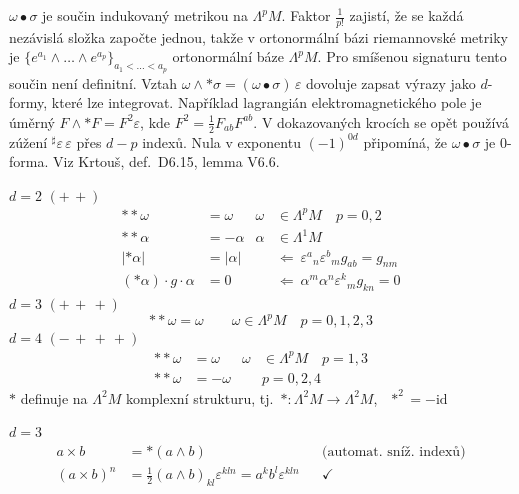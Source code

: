 \begin{vysvetleni}
$\omega\bullet\sigma$ je součin indukovaný metrikou na $\Lambda^pM$. Faktor $\frac1{p!}$ zajistí, že se každá nezávislá složka započte jednou, takže v ortonormální bázi riemannovské metriky je $\{e^{a_1}\wedge\dots\wedge e^{a_p}\}_{a_1<\dots<a_p}$ ortonormální báze $\Lambda^pM$. Pro smíšenou signaturu tento součin není definitní.
Vztah $\omega\wedge*\sigma=(\omega\bullet\sigma)\,\varepsilon$ dovoluje zapsat  výrazy jako $d$-formy, které lze integrovat. Například lagrangián elektromagnetického pole je úměrný $F\wedge*F=F^2\varepsilon$, kde $F^2=\frac12F_{ab}F^{ab}$.
V dokazovaných krocích se opět používá zúžení ${}^\sharp\varepsilon\,\varepsilon$ přes $d-p$ indexů. Nula v exponentu $(-1)^{0d}$ připomíná, že $\omega\bullet\sigma$ je 0-forma.
Viz Krtouš, def.~D6.15, lemma V6.6.
\end{vysvetleni}

\begin{priklad}[příklady]
$d = 2$ \quad $(+\,+)$
\begin{align*}
  **\omega &= \omega & \omega&\in\Lambda^pM \quad p = 0,2 \\
  **\alpha &= -\alpha & \alpha&\in\Lambda^1M \\
  |*\alpha| &= |\alpha| && \Leftarrow\ \varepsilon^a{}_n\varepsilon^b{}_m g_{ab} = g_{nm} \\
  (*\alpha)\cdot g\cdot\alpha &= 0 && \Leftarrow\ \alpha^m\alpha^n\varepsilon^k{}_m g_{kn} = 0
\end{align*}
$d = 3$ \quad $(+\,+\,+)$
\[
  **\omega = \omega \qquad \omega\in\Lambda^pM \quad p = 0,1,2,3
\]
$d = 4$ \quad $(-\,+\,+\,+)$
\begin{align*}
  **\omega &= \omega & \omega&\in\Lambda^pM \quad p = 1,3 \\
  **\omega &= -\omega & & p = 0,2,4
\end{align*}
\quad $*$ definuje na $\Lambda^2M$ komplexní strukturu, tj.\ $*:\Lambda^2M\to\Lambda^2M$, \ $*^2 = -\mathrm{id}$
\end{priklad}

 \quad $d = 3$
\begin{align*}
  a\times b &= *(a\wedge b) && \text{(automat.\ sníž.\ indexů)} \\
  (a\times b)^n &= \tfrac12(a\wedge b)_{kl}\varepsilon^{kln} = a^kb^l\varepsilon^{kln} && \checkmark
\end{align*}

